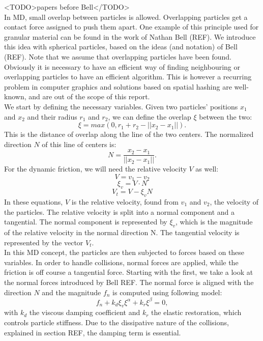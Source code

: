 <TODO>papers before Bell</TODO>\\

In MD, small overlap between particles is allowed. Overlapping particles get a contact force assigned to push them apart. One example of this principle used for granular material can be found in the work of Nathan Bell (REF). We introduce this idea with spherical particles, based on the ideas (and notation) of Bell (REF). Note that we assume that overlapping particles have been found. Obviously it is necessary to have an efficient way of finding neighbouring or overlapping particles to have an efficient algorithm. This is however a recurring problem in computer graphics and solutions based on spatial hashing are well-known, and are out of the scope of this report.\\

We start by defining the necessary variables. Given two particles' positions $x_1$ and $x_2$ and their radius $r_1$ and $r_2$, we can define the overlap $\xi$ between the two:\\
\begin{equation}
\xi = max(0, r_1 + r_2 - || x_2 - x_1||).
\end{equation}
This is the distance of overlap along the line of the two centers. The normalized direction $N$ of this line of centers is:
\begin{equation}
N = \frac{x_2 - x_1}{||x_2 - x_1||}.
\end{equation}
For the dynamic friction, we will need the relative velocity $V$ as well:
\begin{equation}
V = v_1 - v_2
\end{equation}
\begin{equation}
\xi_v = V \cdot N
\end{equation}
\begin{equation}
V_t = V -  \xi_v N
\end{equation}
In these equations, $V$ is the relative velocity, found from $v_1$ and $v_2$, the velocity of the particles. The relative velocity is split into a normal component and a tangential. The normal component is represented by $\xi_v$, which is the magnitude of the relative velocity in the normal direction N. The tangential velocity is represented by the vector $V_t$.\\

In this MD concept, the particles are then subjected to forces based on these variables. In order to handle collisions, normal forces are applied, while the friction is off course a tangential force. Starting with the first, we take a look at the normal forces introduced by Bell REF. The normal force is aligned with the direction $N$ and the magnitude $f_n$ is computed using following model:
\begin{equation} \label{eq_normalf}
f_n + k_d \xi_v \xi^{\alpha} + k_r \xi^{\beta}  = 0,
\end{equation} 
with $k_d$ the viscous damping coefficient and $k_r$ the elastic restoration, which controls particle stiffness. Due to the dissipative nature of the collisions, explained in section REF, the damping term is essential.\\

